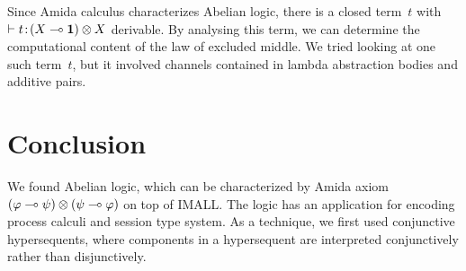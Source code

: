 Since Amida calculus characterizes Abelian logic,
there is a closed term~$t$ with $\vdash {t} \mathord{\colon\kern -2pt}{(X\multimap \mathbf{1})\otimes X}$
derivable.  By analysing this term, we can determine the computational
content of the law of excluded middle.
We tried looking at one such term~$t$, but it involved channels
contained in lambda abstraction bodies and additive pairs.


\section{Conclusion}

We found Abelian logic, which can be characterized by Amida axiom
$(\varphi\multimap\psi)\otimes(\psi\multimap\varphi)$ on top of IMALL.
The logic has an application for encoding process calculi and session type
system.
As a technique, we first used conjunctive hypersequents,
where components in a hypersequent are interpreted conjunctively rather
than disjunctively.
